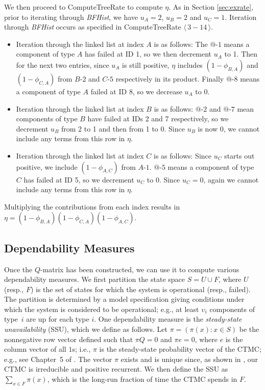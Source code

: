 \documentclass[12pt]{article}
\newcommand{\varName}[1]{\textrm{\it#1}}
\newcommand{\citeBlock}[2]{$\langle \, #1 - #2 \, \rangle$}
\newcommand{\nodeLabel}[2]{\mbox{$#1$-$#2$}}
\begin{document}
We then proceed to ComputeTreeRate to compute $\eta$. As in Section
\ref{sec:exrate}, prior to iterating through \varName{BFHist}, we have $u_A =
2$, $u_B = 2$ and $u_C = 1$. Iteration through \varName{BFHist} occurs as
specified in ComputeTreeRate \citeBlock{3}{14}.

\begin{itemize}
\item Iteration through the linked list at index $A$ is as follows: The
\nodeLabel{@}{1} means a component of type $A$ has failed at ID 1, so we then
decrement $u_{A}$ to 1. Then for the next two entries, since $u_{A}$ is still
positive, $\eta$ includes $(1 - \phi_{B, A})$ and $(1 - \phi_{C, A})$ from
\nodeLabel{B}{2} and \nodeLabel{C}{5} respectively in its product. Finally
\nodeLabel{@}{8} means a component of type $A$ failed at ID 8, so we decrease
$u_A$ to 0.

\item Iteration through the linked list at index $B$ is as follows:
\nodeLabel{@}{2} and \nodeLabel{@}{7} mean components of type $B$ have failed at
IDs 2 and 7 respectively, so we decrement $u_{B}$ from 2 to 1 and then from 1 to
0. Since $u_{B}$ is now 0, we cannot include any terms from this row in $\eta$.

\item Iteration through the linked list at index $C$ is as follows: Since
$u_{C}$ starts out positive, we include $(1 - \phi_{A, C})$ from
\nodeLabel{A}{1}. \nodeLabel{@}{5} means a component of type $C$ has failed at
ID 5, so we decrement $u_{C}$ to 0. Since $u_{C} = 0$, again we cannot include
any terms from this row in $\eta$.
\end{itemize}
Multiplying the contributions from each index results in $\eta = (1 - \phi_{B,
A}) (1 - \phi_{C, A}) (1 - \phi_{A, C})$.


\subsection{Dependability Measures}
\label{sec:depend}

Once the $Q$-matrix has been constructed,
we can use it to compute various
dependability measures.
We first partition the state
space $S = U \cup F$,
where $U$ (resp., $F$)
is the set of states for
which the system is operational
(resp., failed).
The partition is determined
by a model specification
giving conditions under which
the system is considered to be
operational; e.g., at least
$\upsilon_i$ components of type~$i$
are up for each type $i$.
One dependability measure
is the
\textit{steady-state unavailability} (SSU),
which we define as follows.
Let $\pi = (\pi(x) : x \in S)$
be the nonnegative row vector defined
such that $\pi Q = 0$
and $\pi e = 0$, where
$e$ is the column vector of all $1$s;
i.e., $\pi$ is the steady-state
probability vector of the CTMC;
e.g., see Chapter~5 of
\cite{Ross:1995}.
The vector $\pi$ exists and
is unique since, as shown
in \cite{ING:2009}, our
CTMC is irreducible and positive recurrent.
We then define the SSU
as
$\sum_{x \in F} \pi(x)$,
which is the long-run fraction
of time the CTMC spends in $F$.
\end{document}
